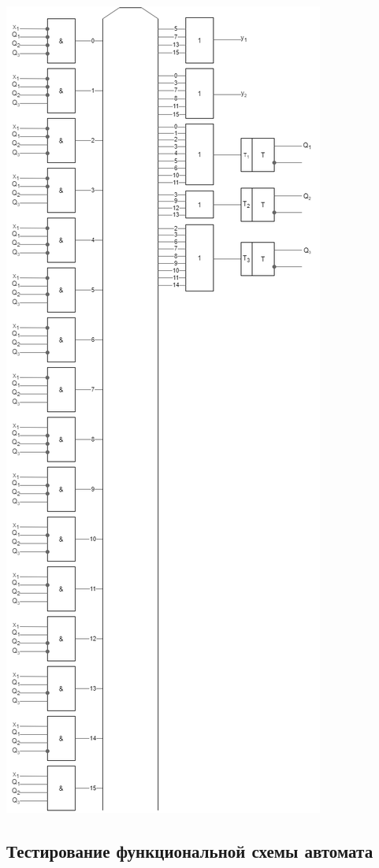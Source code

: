 \documentclass[12pt, a4paper]{article}
\begin{document}
\begin{center}
  \includegraphics[scale=0.5]{t-trigger.png}
\end{center}

\subsection*{Тестирование функциональной схемы автомата}
\end{document}
